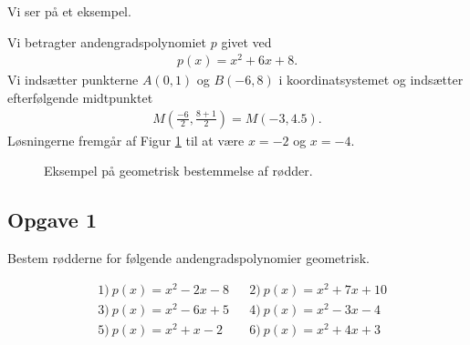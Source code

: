 Vi ser på et eksempel.
\begin{exa}
	Vi betragter andengradspolynomiet $p$ givet ved
	\begin{align*}
		p(x) = x^2 + 6x + 8.
	\end{align*}
	Vi indsætter punkterne $A(0,1)$ og $B(-6,8)$ i koordinatsystemet og indsætter efterfølgende midtpunktet
	\begin{align*}
		M\left(\frac{-6}{2},\frac{8+1}{2}\right) = M(-3,4.5).
	\end{align*}
	Løsningerne fremgår af Figur \ref{fig:exa} til at være $x = -2$ og $x = -4$.
	\begin{figure}[H]
	\centering
	\caption{Eksempel på geometrisk bestemmelse af rødder.}
	\label{fig:exa}
\end{figure}
\end{exa}

\subsection*{Opgave 1}

Bestem rødderne for følgende andengradspolynomier geometrisk. 

\begin{align*}
	&1) \ p(x) = x^2 - 2x - 8 & &2) \ p(x) = x^2 +7x + 10  \\
	&3) \ p(x) = x^2 - 6x + 5  & &4) \ p(x) = x^2 - 3x - 4 \\
	&5) \ p(x) = x^2 + x - 2 & &6) \ p(x) = x^2 + 4x + 3 \\
\end{align*}
